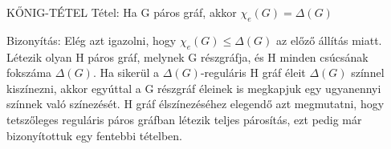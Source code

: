 \documentclass[]{article}
\begin{document}
\begin{framed}
KŐNIG-TÉTEL Tétel: Ha G páros gráf, akkor $\chi_e(G) = \Delta(G)$
\end{framed}
\begin{leftbar}
Bizonyítás: Elég azt igazolni, hogy $\chi_e(G) \leq \Delta(G)$ az előző állítás miatt. Létezik olyan H páros gráf, melynek G részgráfja, és H minden csúcsának fokszáma $\Delta(G)$. Ha sikerül a $\Delta(G)$-reguláris H gráf éleit $\Delta(G)$ színnel kiszínezni, akkor egyúttal a G részgráf éleinek is megkapjuk egy ugyanennyi színnek való színezését. H gráf élszínezéséhez elegendő azt megmutatni, hogy tetszőleges reguláris páros gráfban létezik teljes párosítás, ezt pedig már bizonyítottuk egy fentebbi tételben. 
\end{leftbar}
\end{document}
